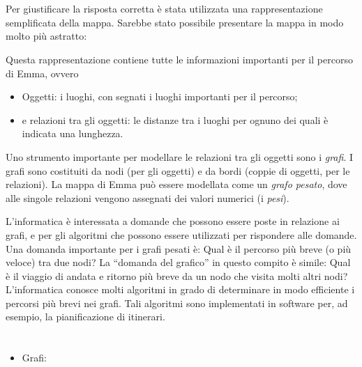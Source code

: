 {{%
\section*{\BrochureItsInformatics}
Per giustificare la risposta corretta è stata utilizzata una rappresentazione semplificata della mappa.
Sarebbe stato possibile presentare la mappa in modo molto più astratto:

{\centering%
\par}

Questa rappresentazione contiene tutte le informazioni importanti per il percorso di Emma, ovvero

\begin{itemize}
  \item Oggetti: i luoghi, con segnati i luoghi importanti per il percorso;
  \item e relazioni tra gli oggetti: le distanze tra i luoghi per ognuno dei quali è indicata una lunghezza.
\end{itemize}

Uno strumento importante per modellare le relazioni tra gli oggetti sono i \emph{grafi}.
I grafi sono costituiti da nodi (per gli oggetti) e da bordi (coppie di oggetti, per le relazioni).
La mappa di Emma può essere modellata come un \emph{grafo pesato},
dove alle singole relazioni vengono assegnati dei valori numerici (i \emph{pesi}).

L’informatica è interessata a domande che possono essere poste in relazione ai grafi,
e per gli algoritmi che possono essere utilizzati per rispondere alle domande.
Una domanda importante per i grafi pesati è:
Qual è il percorso più breve (o più veloce) tra due nodi?
La \enquote{domanda del grafico} in questo compito è simile:
Qual è il viaggio di andata e ritorno più breve da un nodo che visita molti altri nodi?
L’informatica conosce molti algoritmi in grado di determinare in modo efficiente i percorsi più brevi nei grafi.
Tali algoritmi sono implementati in software per, ad esempio, la pianificazione di itinerari.



\section*{\BrochureWebsitesAndKeywords}
{\raggedright
\begin{itemize}
  \item Grafi: \href{https://it.wikipedia.org/wiki/Grafo}{}
\end{itemize}


}}}
